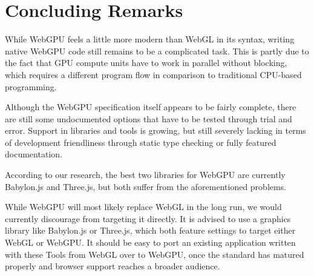 %
%
% 
% 

\chapter{Concluding Remarks}

\label{chap:Conclusion}

While WebGPU feels a little more modern than WebGL in its syntax, writing native WebGPU code
still remains to be a complicated task. This is partly due to the fact that GPU compute units
have to work in parallel without blocking, which requires a different program flow in
comparison to traditional CPU-based programming.

Although the WebGPU specification itself appears to be fairly complete, there are still some
undocumented options that have to be tested through trial and error.
Support in libraries and tools is growing, but still severely lacking in terms of development
friendliness through static type checking or fully featured documentation.

According to our research, the best two libraries for WebGPU are currently Babylon.js and
Three.js, but both suffer from the aforementioned problems.

While WebGPU will most likely replace WebGL in the long run, we would currently discourage from
targeting it directly. It is advised to use a graphics library like Babylon.js or Three.js,
which both feature settings to target either WebGL or WebGPU.
It should be easy to port an existing application written with these Tools from WebGL over to
WebGPU, once the standard has matured properly and browser support reaches a broader audience.
